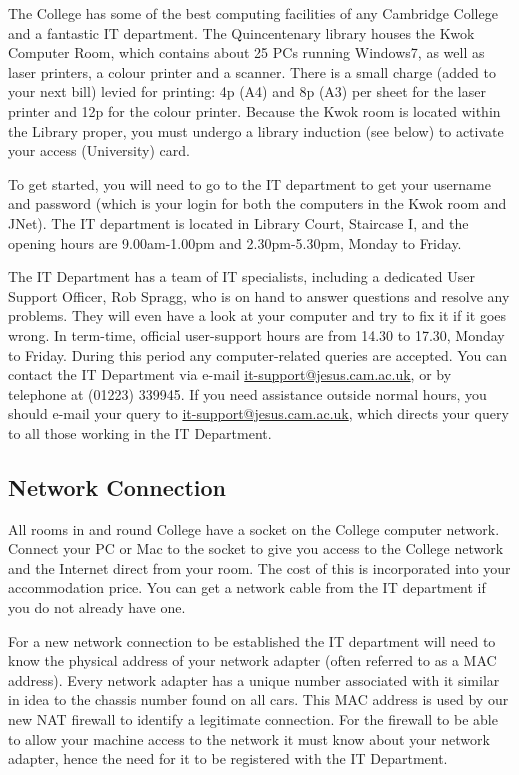 \documentclass[11pt,fleqn, oneside]{book} %
\begin{document}
The College has some of the best computing facilities of any Cambridge College and a fantastic IT department. The Quincentenary library houses the Kwok Computer Room, which contains about 25 PCs running Windows7, as well as laser printers, a colour printer and a scanner. There is a small charge (added to your next bill) levied for printing: 4p (A4) and 8p (A3) per sheet for the laser printer and 12p for the colour printer.  Because the Kwok room is located within the Library proper, you must undergo a library induction (see below) to activate your access (University) card.

To get started, you will need to go to the IT department to get your username and password (which is your login for both the computers in the Kwok room and JNet).  The IT department is located in Library Court, Staircase I, and the opening hours are 9.00am-1.00pm and 2.30pm-5.30pm, Monday to Friday.  

The IT Department has a team of IT specialists, including a dedicated User Support Officer, Rob Spragg, who is on hand to answer questions and resolve any problems.  They will even have a look at your computer and try to fix it if it goes wrong.  In term-time, official user-support hours are from 14.30 to 17.30, Monday to Friday. During this period any computer-related queries are accepted.  You can contact the IT Department via e-mail \url{it-support@jesus.cam.ac.uk}, or by telephone at (01223) 339945. If you need assistance outside normal hours, you should e-mail your query to \url{it-support@jesus.cam.ac.uk}, which directs your query to all those working in the IT Department. 

\subsection{Network Connection}

All rooms in and round College have a socket on the College computer network. Connect your PC or Mac to the socket to give you access to the College network and the Internet direct from your room.  The cost of this is incorporated into your accommodation price.  You can get a network cable from the IT department if you do not already have one. 

For a new network connection to be established the IT department will need to know the physical address of your network adapter (often referred to as a MAC address). Every network adapter has a unique number associated with it similar in idea to the chassis number found on all cars. This MAC address is used by our new NAT firewall to identify a legitimate connection. For the firewall to be able to allow your machine access to the network it must know about your network adapter, hence the need for it to be registered with the IT Department.
\end{document}
